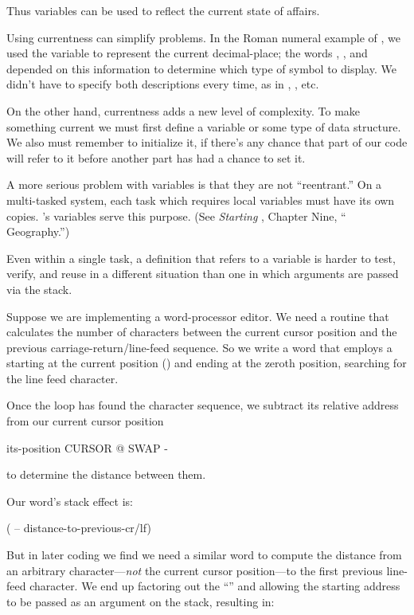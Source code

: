 Thus variables can be used to reflect the current state of affairs.

Using currentness can simplify problems. In the Roman numeral example
of , we used the variable  to represent the
current decimal-place; the words , , and
 depended on this information to determine which type of
symbol to display. We didn't have to specify both descriptions every
time, as in , , etc.

On the other hand, currentness adds a new level of complexity. To
make something current we must first define a variable or some type of
data structure. We also must remember to initialize it, if there's any
chance that part of our code will refer to it before another part has had a
chance to set it.

A more serious problem with variables is that they are not ``reentrant.''
On a multi-tasked \Forth{} system, each task which requires
local variables must have its own copies. \Forth{}'s  variables
serve this purpose. (See \emph{Starting \Forth{}}, Chapter Nine, ``\Forth{}
Geography.'')

Even within a single task, a definition that refers to a variable is
harder to test, verify, and reuse in a different situation than one in which
arguments are passed via the stack.

Suppose we are implementing a word-processor editor. We need a
routine that calculates the number of characters between the current cursor
position and the previous carriage-return/line-feed sequence. So we
write a word that employs a  starting at the current position
() and ending at the zeroth position, searching for the line
feed character.

Once the loop has found the character sequence, we subtract its
relative address from our current cursor position

\begin{Code}
its-position CURSOR @  SWAP -
\end{Code}
to determine the distance between them.

Our word's stack effect is:

\begin{Code}
( -- distance-to-previous-cr/lf)
\end{Code}
But in later coding we find we need a similar word to compute the
distance from an arbitrary character---\emph{not} the current cursor
position---to the first previous line-feed character. We end up factoring
out the ``'' and allowing the starting address to be passed as an
argument on the stack, resulting in:

